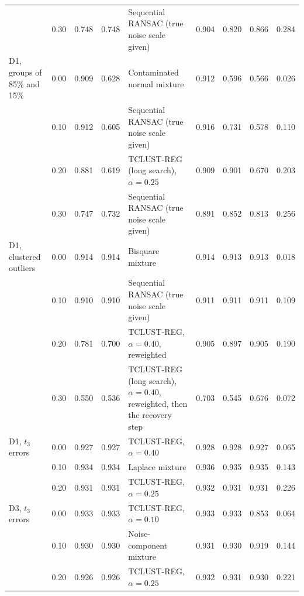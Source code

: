 \begin{table}[htbp]
{\begin{tabular}{lccclcccc}
 & 0.30 & 0.748 & 0.748 & Sequential RANSAC (true noise scale given) & 0.904 & 0.820 & 0.866 & 0.284 \\
\addlinespace
D1, groups of 85\% and 15\% & 0.00 & 0.909 & 0.628 & Contaminated normal mixture & 0.912 & 0.596 & 0.566 & 0.026 \\
 & 0.10 & 0.912 & 0.605 & Sequential RANSAC (true noise scale given) & 0.916 & 0.731 & 0.578 & 0.110 \\
 & 0.20 & 0.881 & 0.619 & TCLUST-REG (long search), $\alpha=0.25$ & 0.909 & 0.901 & 0.670 & 0.203 \\
 & 0.30 & 0.747 & 0.732 & Sequential RANSAC (true noise scale given) & 0.891 & 0.852 & 0.813 & 0.256 \\
\addlinespace
D1, clustered outliers & 0.00 & 0.914 & 0.914 & Bisquare mixture & 0.914 & 0.913 & 0.913 & 0.018 \\
 & 0.10 & 0.910 & 0.910 & Sequential RANSAC (true noise scale given) & 0.911 & 0.911 & 0.911 & 0.109 \\
 & 0.20 & 0.781 & 0.700 & TCLUST-REG, $\alpha=0.40$, reweighted & 0.905 & 0.897 & 0.905 & 0.190 \\
 & 0.30 & 0.550 & 0.536 & TCLUST-REG (long search), $\alpha=0.40$, reweighted, then the recovery step & 0.703 & 0.545 & 0.676 & 0.072 \\
\addlinespace
D1, $t_3$ errors & 0.00 & 0.927 & 0.927 & TCLUST-REG, $\alpha=0.40$ & 0.928 & 0.928 & 0.927 & 0.065 \\
 & 0.10 & 0.934 & 0.934 & Laplace mixture & 0.936 & 0.935 & 0.935 & 0.143 \\
 & 0.20 & 0.931 & 0.931 & TCLUST-REG, $\alpha=0.25$ & 0.932 & 0.931 & 0.931 & 0.226 \\
\addlinespace
D3, $t_3$ errors & 0.00 & 0.933 & 0.933 & TCLUST-REG, $\alpha=0.10$ & 0.933 & 0.933 & 0.853 & 0.064 \\
 & 0.10 & 0.930 & 0.930 & Noise-component mixture & 0.931 & 0.930 & 0.919 & 0.144 \\
 & 0.20 & 0.926 & 0.926 & TCLUST-REG, $\alpha=0.25$ & 0.932 & 0.931 & 0.930 & 0.221 \\
\bottomrule
\end{tabular}}
\end{table}